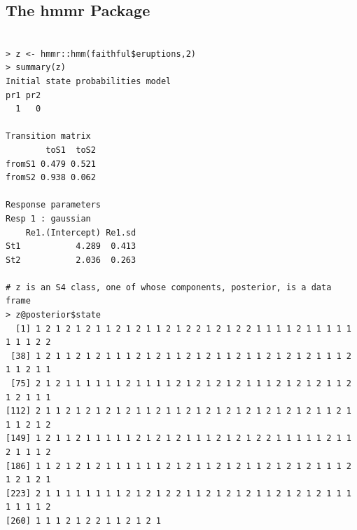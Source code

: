 \documentclass[11pt]{article}
\begin{document}
\subsection{The hmmr Package}

\begin{lstlisting}

> z <- hmmr::hmm(faithful$eruptions,2)
> summary(z)
Initial state probabilities model 
pr1 pr2 
  1   0 

Transition matrix 
        toS1  toS2
fromS1 0.479 0.521
fromS2 0.938 0.062

Response parameters 
Resp 1 : gaussian 
    Re1.(Intercept) Re1.sd
St1           4.289  0.413
St2           2.036  0.263

# z is an S4 class, one of whose components, posterior, is a data frame
> z@posterior$state
  [1] 1 2 1 2 1 2 1 1 2 1 2 1 1 2 1 2 2 1 2 1 2 2 1 1 1 1 2 1 1 1 1 1 1 1 1 2 2
 [38] 1 2 1 1 2 1 2 1 1 1 2 1 2 1 1 2 1 2 1 1 2 1 1 2 1 2 1 2 1 1 1 2 1 1 2 1 1
 [75] 2 1 2 1 1 1 1 1 1 2 1 1 1 1 2 1 2 1 2 1 2 1 1 1 2 1 2 1 2 1 1 2 1 2 1 1 1
[112] 2 1 1 2 1 2 1 2 1 2 1 1 2 1 1 2 1 2 1 2 1 2 1 2 1 2 1 2 1 1 2 1 1 1 2 1 2
[149] 1 2 1 1 2 1 1 1 1 1 2 1 2 1 2 1 1 1 2 1 2 1 2 2 1 1 1 1 1 2 1 1 2 1 1 1 2
[186] 1 1 2 1 2 1 2 1 1 1 1 1 1 2 1 2 1 1 2 1 2 1 1 2 1 2 1 2 1 1 1 2 1 2 1 2 1
[223] 2 1 1 1 1 1 1 1 1 2 1 2 1 2 2 1 1 2 1 2 1 2 1 1 2 1 2 1 2 1 1 1 1 1 1 1 2
[260] 1 1 1 2 1 2 2 1 1 2 1 2 1

\end{lstlisting}


% 
% 
% 
% 
% 

% 
% 
\end{document}
